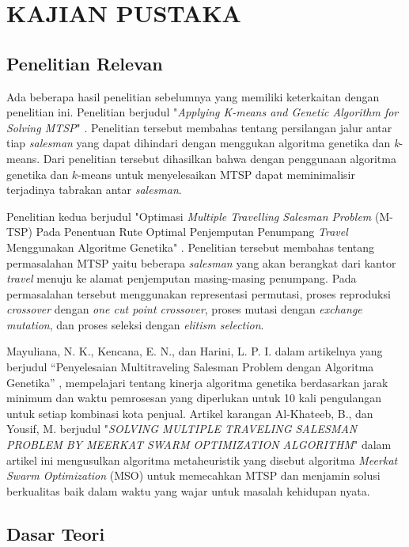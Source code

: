 \chapter{KAJIAN PUSTAKA}

\section{Penelitian Relevan}

Ada beberapa hasil penelitian sebelumnya yang memiliki keterkaitan dengan penelitian ini. Penelitian berjudul "\textit{Applying K-means and Genetic Algorithm for Solving MTSP}" \cite{inproceedings}. Penelitian tersebut membahas tentang persilangan jalur antar tiap \textit{salesman} yang dapat dihindari dengan menggukan algoritma genetika dan \textit{k}-means. Dari penelitian tersebut dihasilkan bahwa dengan penggunaan algoritma genetika dan $k$-means untuk menyelesaikan MTSP dapat meminimalisir terjadinya tabrakan antar \textit{salesman}.

Penelitian kedua berjudul "Optimasi \textit{Multiple Travelling Salesman Problem} (M-TSP) Pada Penentuan Rute Optimal Penjemputan Penumpang \textit{Travel} Menggunakan Algoritme Genetika" \cite{raditya2017optimasi}. Penelitian tersebut membahas tentang permasalahan MTSP yaitu beberapa \textit{salesman} yang akan berangkat dari kantor \textit{travel} menuju ke alamat penjemputan masing-masing penumpang. Pada permasalahan tersebut menggunakan representasi permutasi, proses reproduksi \textit{crossover} dengan \textit{one cut point crossover}, proses mutasi dengan \textit{exchange mutation}, dan proses seleksi dengan \textit{elitism selection}.

Mayuliana, N. K., Kencana, E. N., dan Harini, L. P. I. dalam artikelnya yang berjudul “Penyelesaian Multitraveling Salesman Problem dengan Algoritma Genetika” \cite{mayuliana2015penyelesaian}, mempelajari tentang kinerja algoritma genetika berdasarkan jarak minimum dan waktu pemrosesan yang diperlukan untuk 10 kali pengulangan untuk setiap kombinasi kota penjual. Artikel karangan Al-Khateeb, B., dan Yousif, M. berjudul "\textit{SOLVING MULTIPLE TRAVELING SALESMAN PROBLEM BY MEERKAT SWARM OPTIMIZATION ALGORITHM}" \cite{al2019solving} dalam artikel ini mengusulkan algoritma metaheuristik yang disebut algoritma \textit{Meerkat Swarm Optimization} (MSO) untuk memecahkan MTSP dan menjamin solusi berkualitas baik dalam waktu yang wajar untuk masalah kehidupan nyata.

\section{Dasar Teori}

